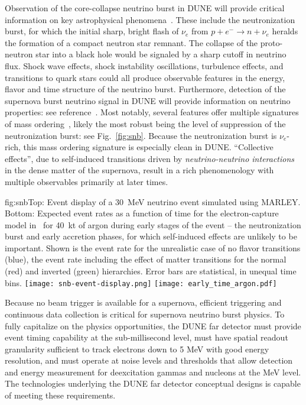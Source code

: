 Observation of the core-collapse neutrino burst in DUNE
will provide critical information on key
astrophysical phenomena~\cite{Mirizzi:2015eza}.  These include the neutronization burst, for which the initial sharp, bright flash
of $\nu_e$ from  $p+e^- \rightarrow n + \nu_e$
heralds the formation of a compact neutron star remnant.
The collapse of the proto-neutron star into a black hole would be signaled by a sharp cutoff in neutrino flux.
Shock wave effects, shock instability oscillations, turbulence effects, and transitions to quark stars could all produce observable features in the energy, flavor and time structure of the neutrino burst.
Furthermore, detection of the supernova burst 
neutrino signal in DUNE will provide information on neutrino properties: see reference~\cite{Mirizzi:2015eza}.  Most notably, several features offer multiple signatures of mass ordering~\cite{Scholberg:2017czd}, likely the most robust being the level of suppression of the  neutronization burst: see Fig.~\ref{fig:snb}.  Because the neutronization burst is $\nu_e$-rich, this mass ordering signature is especially clean in DUNE.
``Collective effects'', due to self-induced transitions driven by \textit{neutrino-neutrino interactions} in the dense matter of the supernova, result in a rich phenomenology with multiple observables primarily at later times.  


\begin{dunefigure}{fig:snb}{Top: Event display of a \SI{30}{MeV} neutrino event simulated using MARLEY. Bottom: Expected event rates as a function of time for the electron-capture  model in~\cite{Huedepohl:2009wh} for \SI{40}{kt} of argon during early stages of the event -- the neutronization burst and early accretion phases, for which self-induced effects are unlikely to be important.  Shown is the event rate for the unrealistic case of no flavor transitions (blue), the event rate including the effect of matter transitions for the normal (red)  and inverted (green) hierarchies.  Error bars are statistical, in unequal time bins.}
\texttt{[image: snb-event-display.png]}
\texttt{[image: early\_time\_argon.pdf]}
\end{dunefigure}

Because no beam trigger is available for a supernova, efficient triggering and continuous data collection is critical for supernova neutrino burst physics. To fully capitalize on the physics opportunities, the DUNE far detector must provide event timing capability at the sub-millisecond level, must have spatial readout granularity sufficient to track electrons down to 5 MeV with good energy resolution, and must operate at noise levels and thresholds that allow detection and energy measurement for deexcitation gammas and nucleons at the MeV level.  The \lartpc technologies underlying the DUNE far detector conceptual designs is capable of meeting these requirements.

